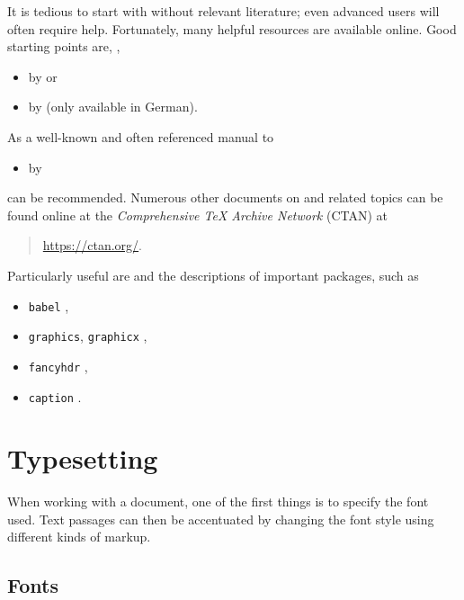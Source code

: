 It is tedious to start with \latex without relevant literature; even advanced
users will often require help. Fortunately, many helpful resources are available
online. Good starting points are, \eg,
%
\begin{itemize}
    \item {} by \textcite{Oetiker2021} or
	\item {} by \textcite{Daniel2018} (only available in German).

\end{itemize}
%
\noindent
As a well-known and often referenced manual to \latex 
%
\begin{itemize}
    \item {} by \textcite{Kopka2003}
\end{itemize}
%
can be recommended. Numerous other documents on \latex and related topics can be
found online at the \emph{Comprehensive TeX Archive Network} (CTAN) at
%
\begin{quote}
    \url{https://ctan.org/}.
\end{quote}
%
Particularly useful are  \cite{Pakin2021} and the
descriptions of important \latex packages, such as
%
\begin{itemize}
    \item[] \texttt{babel} \cite{Bezos2023},
    \item[] \texttt{graphics}, \texttt{graphicx} \cite{Carlisle2021},
    \item[] \texttt{fancyhdr} \cite{Oostrum2022},
    \item[] \texttt{caption} \cite{Sommerfeldt2022}.
\end{itemize}


\section{Typesetting}

When working with a \latex document, one of the first things is to specify the
font used. Text passages can then be accentuated by changing the font style
using different kinds of markup.

\subsection{Fonts}

